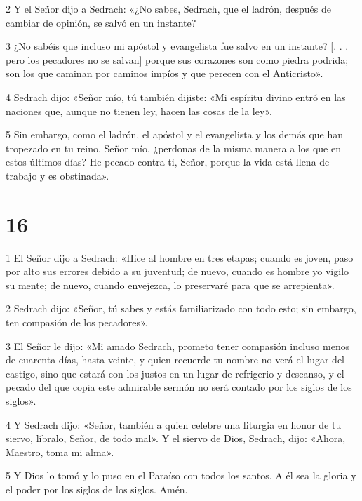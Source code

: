 \par 2 Y el Señor dijo a Sedrach: «¿No sabes, Sedrach, que el ladrón, después de cambiar de opinión, se salvó en un instante?

\par 3 ¿No sabéis que incluso mi apóstol y evangelista fue salvo en un instante? [. . . pero los pecadores no se salvan] porque sus corazones son como piedra podrida; son los que caminan por caminos impíos y que perecen con el Anticristo».

\par 4 Sedrach dijo: «Señor mío, tú también dijiste: «Mi espíritu divino entró en las naciones que, aunque no tienen ley, hacen las cosas de la ley».

\par 5 Sin embargo, como el ladrón, el apóstol y el evangelista y los demás que han tropezado en tu reino, Señor mío, ¿perdonas de la misma manera a los que en estos últimos días? He pecado contra ti, Señor, porque la vida está llena de trabajo y es obstinada».

\chapter{16}

\par 1 El Señor dijo a Sedrach: «Hice al hombre en tres etapas; cuando es joven, paso por alto sus errores debido a su juventud; de nuevo, cuando es hombre yo vigilo su mente; de nuevo, cuando envejezca, lo preservaré para que se arrepienta».

\par 2 Sedrach dijo: «Señor, tú sabes y estás familiarizado con todo esto; sin embargo, ten compasión de los pecadores».

\par 3 El Señor le dijo: «Mi amado Sedrach, prometo tener compasión incluso menos de cuarenta días, hasta veinte, y quien recuerde tu nombre no verá el lugar del castigo, sino que estará con los justos en un lugar de refrigerio y descanso, y el pecado del que copia este admirable sermón no será contado por los siglos de los siglos».

\par 4 Y Sedrach dijo: «Señor, también a quien celebre una liturgia en honor de tu siervo, líbralo, Señor, de todo mal». Y el siervo de Dios, Sedrach, dijo: «Ahora, Maestro, toma mi alma».

\par 5 Y Dios lo tomó y lo puso en el Paraíso con todos los santos. A él sea la gloria y el poder por los siglos de los siglos. Amén.




